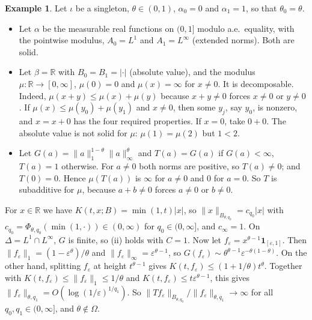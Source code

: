 \documentclass[11pt]{article}
\theoremstyle{definition}
\newtheorem{example}[theorem]{Example}
\theoremstyle{remark}
\newcommand{\abs}[1]{\lvert #1\rvert}
\newcommand{\norm}[2]{\lVert #1\rVert_{#2}}
\newcommand{\R}{\mathbb R}
\newcommand{\one}{\mathbf 1}
\begin{document}
\begin{example}
  Let \(\iota\) be a singleton, \(\theta\in(0,1)\), \(\alpha_0 = 0\) and \(\alpha_1 = 1\), so
  that \(\theta_0 = \theta\).
  \begin{itemize}
    \item Let \(\alpha\) be the measurable real functions on \((0,1]\) modulo a.e.\ equality,
      with the pointwise modulus, \(A_0 = L^1\) and \(A_1 = L^\infty\) (extended norms). Both
      are solid.
    \item Let \(\beta = \R\) with \(B_0 = B_1 = \abs{\cdot}\) (absolute value), and the
      modulus \(\mu\colon\R\to[0,\infty]\), \(\mu(0) = 0\) and \(\mu(x) = \infty\) for
      \(x\ne0\). It is decomposable. Indeed, \(\mu(x+y)\le\mu(x)+\mu(y)\) because
      \(x+y\ne0\) forces \(x\ne0\) or \(y\ne0\). If \(\mu(x)\le\mu(y_0)+\mu(y_1)\) and
      \(x\ne0\), then some \(y_j\), say \(y_0\), is nonzero, and \(x = x + 0\) has the four
      required properties. If \(x = 0\), take \(0+0\). The absolute value is not solid for
      \(\mu\): \(\mu(1) = \mu(2)\) but \(1<2\).
    \item Let \(G(a) = \norm{a}{1}^{1-\theta}\norm{a}{\infty}^{\theta}\) and \(T(a) = G(a)\)
      if \(G(a)<\infty\), \(T(a) = 1\) otherwise. For \(a\ne0\) both norms are positive, so
      \(T(a)\ne0\); and \(T(0) = 0\). Hence \(\mu(T(a))\) is \(\infty\) for \(a\ne0\) and
      \(0\) for \(a = 0\). So \(T\) is subadditive for \(\mu\), because \(a+b\ne0\) forces
      \(a\ne0\) or \(b\ne0\).
  \end{itemize}
  For \(x\in\R\) we have \(K(t,x;B) = \min(1,t)\abs{x}\), so
  \(\norm{x}{B_{\theta,q_0}} = c_{q_0}\abs{x}\) with
  \(c_{q_0} = \Phi_{\theta,q_0}(\min(1,\cdot))\in(0,\infty)\) for \(q_0\in(0,\infty]\), and
  \(c_\infty = 1\). On \(\Delta = L^1\cap L^\infty\), \(G\) is finite, so (ii) holds with
  \(C = 1\). Now let \(f_\varepsilon = x^{\theta-1}\one_{[\varepsilon,1]}\). Then
  \(\norm{f_\varepsilon}{1} = (1-\varepsilon^\theta)/\theta\) and
  \(\norm{f_\varepsilon}{\infty} = \varepsilon^{\theta-1}\), so
  \(G(f_\varepsilon) \sim \theta^{\theta-1}\varepsilon^{-\theta(1-\theta)}\). On the other
  hand, splitting \(f_\varepsilon\) at height \(t^{\theta-1}\) gives
  \(K(t,f_\varepsilon) \le (1+1/\theta)t^\theta\). Together with
  \(K(t,f_\varepsilon)\le\norm{f_\varepsilon}{1}\le1/\theta\) and
  \(K(t,f_\varepsilon)\le t\varepsilon^{\theta-1}\), this gives
  \(\norm{f_\varepsilon}{\theta,q_1} = O(\log(1/\varepsilon)^{1/q_1})\). So
  \(\norm{Tf_\varepsilon}{B_{\theta,q_0}}/\norm{f_\varepsilon}{\theta,q_1}\to\infty\) for all
  \(q_0,q_1\in(0,\infty]\), and \(\theta\notin\Omega\).
\end{example}
\end{document}

